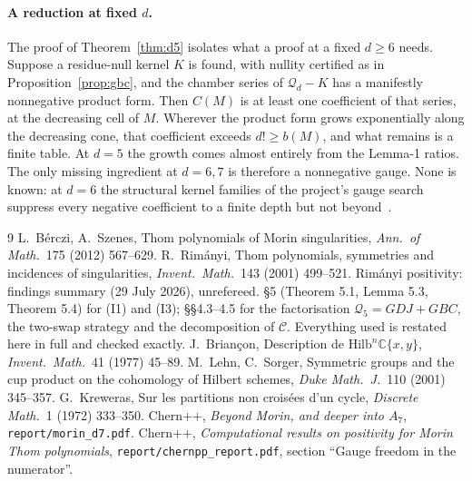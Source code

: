 \documentclass[11pt,a4paper]{article}
\theoremstyle{plain}
\theoremstyle{definition}
\theoremstyle{remark}
\begin{document}
\paragraph{A reduction at fixed $d$.} The proof of Theorem~\ref{thm:d5} isolates what a proof at a
fixed $d \ge 6$ needs. Suppose a residue-null kernel $K$ is found, with nullity certified as in
Proposition~\ref{prop:gbc}, and the chamber series of $\mathcal Q_d - K$ has a manifestly
nonnegative product form. Then $C(M)$ is at least one coefficient of that series, at the
decreasing cell of $M$. Wherever the product form grows exponentially along the decreasing cone,
that coefficient exceeds $d! \ge b(M)$, and what remains is a finite table. At $d = 5$ the growth
comes almost entirely from the Lemma-1 ratios. The only missing ingredient at $d = 6, 7$ is
therefore a nonnegative gauge. None is known: at $d = 6$ the structural kernel families of
the project's gauge search suppress every negative coefficient to a finite depth but not
beyond~\cite{Main}.

\begin{thebibliography}{9}
 L.~B\'erczi, A.~Szenes, Thom polynomials of Morin singularities, \emph{Ann.\ of Math.}\ 175 (2012) 567--629.
 R.~Rim\'anyi, Thom polynomials, symmetries and incidences of singularities, \emph{Invent.\ Math.}\ 143 (2001) 499--521.
 Rim\'anyi positivity: findings summary (29 July 2026), unrefereed. \S5 (Theorem 5.1, Lemma 5.3, Theorem 5.4) for (I1) and (I3); \S\S4.3--4.5 for the factorisation $\mathcal Q_5 = GDJ + GBC$, the two-swap strategy and the decomposition of $\mathcal C$. Everything used is restated here in full and checked exactly.
 J.~Brian\c{c}on, Description de $\mathrm{Hilb}^n\mathbb{C}\{x,y\}$, \emph{Invent.\ Math.}\ 41 (1977) 45--89.
 M.~Lehn, C.~Sorger, Symmetric groups and the cup product on the cohomology of Hilbert schemes, \emph{Duke Math.\ J.}\ 110 (2001) 345--357.
 G.~Kreweras, Sur les partitions non crois\'ees d'un cycle, \emph{Discrete Math.}\ 1 (1972) 333--350.
 Chern++, \emph{Beyond Morin, and deeper into $A_7$}, \texttt{report/morin\_d7.pdf}.
 Chern++, \emph{Computational results on positivity for Morin Thom polynomials}, \texttt{report/chernpp\_report.pdf}, section ``Gauge freedom in the numerator''.
\end{thebibliography}
\end{document}
